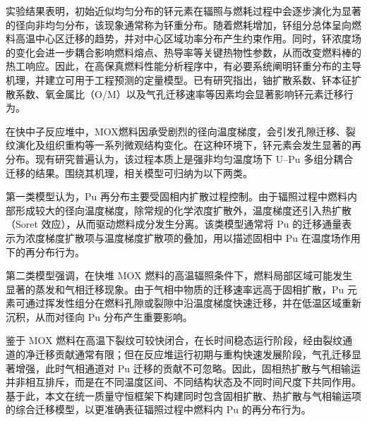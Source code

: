 实验结果表明\cite{clementPlutoniumRedistributionMixed1978}，初始近似均匀分布的钚元素在辐照与燃耗过程中会逐步演化为显著的径向非均匀分布，该现象通常称为钚重分布。随着燃耗增加，钚组分总体呈向燃料高温中心区迁移的趋势，并对中心区域功率分布产生约束作用\cite{meyerAnalysisPlutoniumSegregation1974}。同时，钚浓度场的变化会进一步耦合影响燃料熔点、热导率等关键热物性参数，从而改变燃料棒的热工响应。因此，在高保真燃料性能分析程序中，有必要系统阐明钚重分布的主导机理，并建立可用于工程预测的定量模型。已有研究\cite{boberPlutoniumRedistributionFast1973,matzkeDiffusionProcessesSurface1983}指出，铀扩散系数、钚本征扩散系数、氧金属比（O/M）以及气孔迁移速率等因素均会显著影响钚元素迁移行为。

\label{subsec:plutonium_migration}

在快中子反应堆中，MOX燃料因承受剧烈的径向温度梯度，会引发孔隙迁移、裂纹演化及组织重构等一系列微观结构变化。在这种环境下，钚元素会发生显著的再分布。现有研究\cite{boberMATERIALTRANSPORTTEMPERATURE1973,hoffmannCrackFormationCrack1974,clementPlutoniumRedistributionMixed1978}普遍认为，该过程本质上是强非均匀温度场下 U--Pu 多组分耦合迁移的结果。围绕其机理，相关模型可归纳为以下两类。

第一类模型认为，Pu 再分布主要受固相内扩散过程控制\cite{olanderFundamentalAspectsNuclear1976}。由于辐照过程中燃料内部形成较大的径向温度梯度，除常规的化学浓度扩散外，温度梯度还引入热扩散（Soret 效应），从而驱动燃料成分发生分离。该类模型通常将 Pu 的迁移通量表示为浓度梯度扩散项与温度梯度扩散项的叠加，用以描述固相中 Pu 在温度场作用下的再分布行为。

第二类模型\cite{boberMATERIALTRANSPORTTEMPERATURE1973}强调，在快堆 MOX 燃料的高温辐照条件下，燃料局部区域可能发生显著的蒸发和气相迁移现象。由于气相中物质的迁移速率远高于固相扩散，Pu 元素可通过挥发性组分在燃料孔隙或裂隙中沿温度梯度快速迁移，并在低温区域重新沉积，从而对径向 Pu 分布产生重要影响。

鉴于 MOX 燃料在高温下裂纹可较快闭合\cite{clementPlutoniumRedistributionMixed1978,olanderKineticsActinideRedistribution1973}，在长时间稳态运行阶段，经由裂纹通道的净迁移贡献通常有限；但在反应堆运行初期与重构快速发展阶段，气孔迁移显著增强，此时气相通道对 Pu 迁移的贡献不可忽略\cite{clementPlutoniumRedistributionMixed1978}。因此，固相热扩散与气相输运并非相互排斥，而是在不同温度区间、不同结构状态及不同时间尺度下共同作用。基于此，本文在统一质量守恒框架下构建同时包含固相扩散、热扩散与气相输运项的综合迁移模型，以更准确表征辐照过程中燃料内 Pu 的再分布行为。

